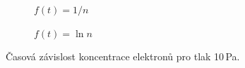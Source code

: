 \documentclass[a4paper,12pt]{article}
\begin{document}
\begin{figure}[h]
	\centering
	\begin{subfigure}[b]{.49\linewidth}
		\centering
		\caption{$f(t) = 1/n$}
	\end{subfigure}
	\begin{subfigure}[b]{.49\linewidth}
		\centering
		\caption{$f(t) = \ln n$}
	\end{subfigure}
	\caption{Časová závislost koncentrace elektronů pro tlak 10\,Pa.}
	\label{g:10Pa}
\end{figure}
\end{document}
